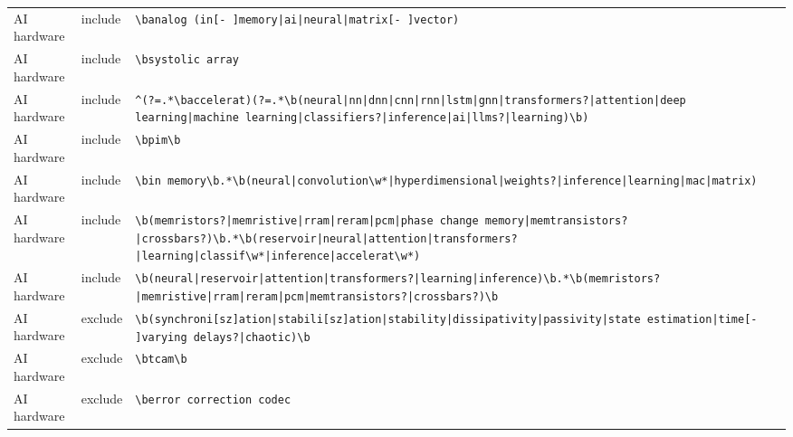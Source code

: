 \documentclass[10pt]{article}
\begin{document}
\begin{longtable}{@{}lL{1.6cm}L{11.5cm}@{}}
AI hardware & include & \texttt{\textbackslash{}banalog \allowbreak(in[- ]memory\allowbreak|ai\allowbreak|neural\allowbreak|matrix[- ]vector)} \\
AI hardware & include & \texttt{\textbackslash{}bsystolic array} \\
AI hardware & include & \texttt{\textasciicircum{}\allowbreak(?=.*\textbackslash{}baccelerat)\allowbreak(?=.*\textbackslash{}b\allowbreak(neural\allowbreak|nn\allowbreak|dnn\allowbreak|cnn\allowbreak|rnn\allowbreak|lstm\allowbreak|gnn\allowbreak|transformers?\allowbreak|attention\allowbreak|deep learning\allowbreak|machine learning\allowbreak|classifiers?\allowbreak|inference\allowbreak|ai\allowbreak|llms?\allowbreak|learning)\textbackslash{}b)} \\
AI hardware & include & \texttt{\textbackslash{}bpim\textbackslash{}b} \\
AI hardware & include & \texttt{\textbackslash{}bin memory\textbackslash{}b.*\textbackslash{}b\allowbreak(neural\allowbreak|convolution\textbackslash{}w*\allowbreak|hyperdimensional\allowbreak|weights?\allowbreak|inference\allowbreak|learning\allowbreak|mac\allowbreak|matrix)} \\
AI hardware & include & \texttt{\textbackslash{}b\allowbreak(memristors?\allowbreak|memristive\allowbreak|rram\allowbreak|reram\allowbreak|pcm\allowbreak|phase change memory\allowbreak|memtransistors?\allowbreak|crossbars?)\textbackslash{}b.*\textbackslash{}b\allowbreak(reservoir\allowbreak|neural\allowbreak|attention\allowbreak|transformers?\allowbreak|learning\allowbreak|classif\textbackslash{}w*\allowbreak|inference\allowbreak|accelerat\textbackslash{}w*)} \\
AI hardware & include & \texttt{\textbackslash{}b\allowbreak(neural\allowbreak|reservoir\allowbreak|attention\allowbreak|transformers?\allowbreak|learning\allowbreak|inference)\textbackslash{}b.*\textbackslash{}b\allowbreak(memristors?\allowbreak|memristive\allowbreak|rram\allowbreak|reram\allowbreak|pcm\allowbreak|memtransistors?\allowbreak|crossbars?)\textbackslash{}b} \\
AI hardware & exclude & \texttt{\textbackslash{}b\allowbreak(synchroni[sz]ation\allowbreak|stabili[sz]ation\allowbreak|stability\allowbreak|dissipativity\allowbreak|passivity\allowbreak|state estimation\allowbreak|time[- ]varying delays?\allowbreak|chaotic)\textbackslash{}b} \\
AI hardware & exclude & \texttt{\textbackslash{}btcam\textbackslash{}b} \\
AI hardware & exclude & \texttt{\textbackslash{}berror correction codec} \\

\end{longtable}
\end{document}
